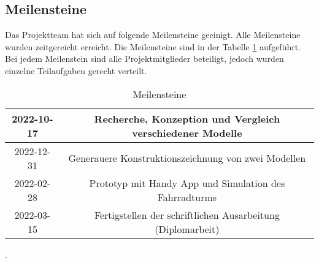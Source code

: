 \subsection{Meilensteine}
Das Projektteam hat sich auf folgende Meilensteine geeinigt. Alle Meilensteine wurden zeitgereicht erreicht. Die Meilensteine sind in der Tabelle \ref{tab:meilensteine} aufgeführt. Bei jedem Meilenstein sind alle Projektmitglieder beteiligt, jedoch wurden einzelne Teilaufgaben gerecht verteilt.

\begin{table}[h]
  \begin{center}
    \begin{tabular} { |c|c| }
      \hline
      2022-10-17 & Recherche, Konzeption und Vergleich verschiedener Modelle   \\
      \hline
      2022-12-31 & Generauere Konstruktionszeichnung von zwei Modellen         \\
      \hline
      2022-02-28 & Prototyp mit Handy App und Simulation des Fahrradturms      \\
      \hline
      2022-03-15 & Fertigstellen der schriftlichen Ausarbeitung (Diplomarbeit) \\
      \hline
    \end{tabular}
    \caption{Meilensteine}.
    \label{tab:meilensteine}
  \end{center}
\end{table}